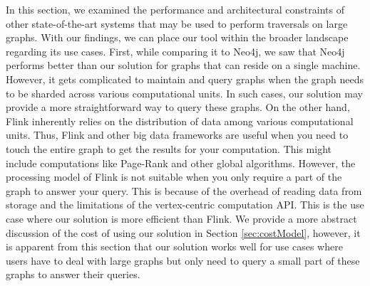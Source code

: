 In this section, we examined the performance and architectural constraints of
other state-of-the-art systems that may be used to perform traversals on
large graphs. With our findings, we can place our tool within the broader
landscape regarding its use cases. First, while comparing it to Neo4j, we saw that
Neo4j performs better than our solution for graphs
that can reside on a single machine. However, it gets complicated to maintain
and query graphs when the graph needs to be sharded across various computational
units. In such cases, our solution may provide a more straightforward way to query these
graphs. On the other hand, Flink inherently relies on the distribution of data among
various computational units. Thus, Flink and other big data frameworks are
useful when you need to touch the entire graph to get the results for
your computation. This might include computations like Page-Rank and other
global algorithms. However, the processing model of Flink is not suitable when
you only require a part of the graph to answer your query. This is because of the overhead
of reading data from storage and the limitations of the vertex-centric computation API. This is 
the use case where our solution is more efficient than Flink. We provide
a more abstract discussion of the cost of using our solution in Section 
\ref{sec:costModel}, however, it is apparent from this section that our
solution works well for use cases where users have to deal with large graphs but
only need to query a small part of these graphs to answer their queries.

